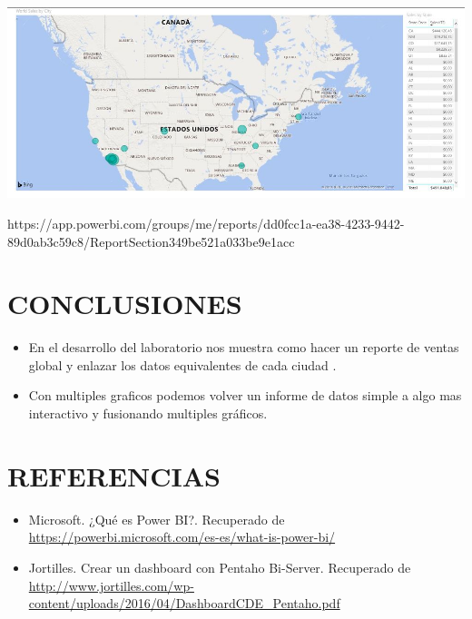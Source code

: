 \documentclass[12pt,letterpaper]{article}
\begin{document}
	\begin{center}
	\includegraphics[width=16cm]{./Imagenes/img2}
	\end{center}
\par https://app.powerbi.com/groups/me/reports/dd0fcc1a-ea38-4233-9442-89d0ab3c59c8/ReportSection349be521a033be9e1acc
\section{CONCLUSIONES}
\begin{itemize}
	\item En el desarrollo del laboratorio nos muestra como hacer un reporte de ventas global y enlazar los datos equivalentes de cada ciudad .
	\item Con multiples graficos podemos volver un informe de datos simple a algo mas interactivo y fusionando multiples gráficos.
\end{itemize}
\section{REFERENCIAS}
\begin{itemize}
	\item Microsoft. ¿Qué es Power BI?. Recuperado de \url{https://powerbi.microsoft.com/es-es/what-is-power-bi/}
	\item Jortilles. Crear un dashboard con Pentaho Bi-Server. Recuperado de \url{http://www.jortilles.com/wp-content/uploads/2016/04/DashboardCDE_Pentaho.pdf}

\end{itemize}
\end{document}
